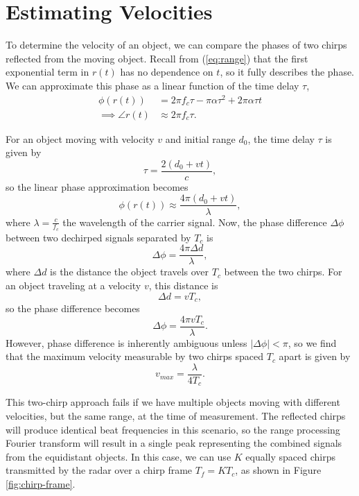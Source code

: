 \chapter{Estimating Velocities}
To determine the velocity of an object, we can compare the phases of two chirps
reflected from the moving object. Recall from (\ref{eq:range}) that the first
exponential term in $r(t)$ has no dependence on $t$, so it fully describes the phase. We
can approximate this phase as a linear function of the time delay $\tau$, 
\begin{align}
	\phi(r(t)) &= 2\pi f_c \tau - \pi \alpha \tau^2 + 2\pi\alpha\tau t \\
	\implies \angle r(t) &\approx 2\pi f_c \tau.
\end{align}

For an object moving with velocity $v$ and initial range $d_0$, the time delay
$\tau$ is given by 
\begin{equation}
	\tau = \frac{2(d_0 + vt)}{c}, \label{eq:moving-tau}
\end{equation}
so the linear phase approximation becomes
\begin{equation}
	\phi(r(t)) \approx \frac{4\pi(d_0 + vt)}{\lambda},
\end{equation}
where $\lambda = \frac{c}{f_c}$ the wavelength of
the carrier signal. Now, the phase difference $\Delta \phi$ between two
dechirped signals separated by
$T_c$ is
\begin{equation}
	\Delta\phi = \frac{4\pi \Delta d}{\lambda},
\end{equation}
where $\Delta d$ is the distance the object travels over $T_c$ between the two
chirps. For an object traveling at a velocity $v$, this distance is
\begin{equation}
	\Delta d = v T_c, 
\end{equation}
so the phase difference becomes
\begin{equation}
	\label{phase_diff}
	\Delta\phi = \frac{4\pi v T_c}{\lambda}.
\end{equation}
However, phase difference is inherently ambiguous unless $|\Delta\phi|<\pi$, so
we find that the maximum velocity measurable by two chirps spaced $T_c$ apart is
given by
\begin{equation}
	v_{max} = \frac{\lambda}{4 T_c}.
\end{equation} 

This two-chirp approach fails if we have multiple objects moving with different
velocities, but the same range, at the time of measurement. The reflected chirps
will produce identical beat frequencies in this scenario, so the range processing
Fourier transform will result in a single peak representing the combined signals
from the equidistant objects. In this case, we can use $K$ equally spaced chirps 
transmitted by the radar over a chirp frame $T_f = KT_c$, as shown in Figure
\ref{fig:chirp-frame}. 

